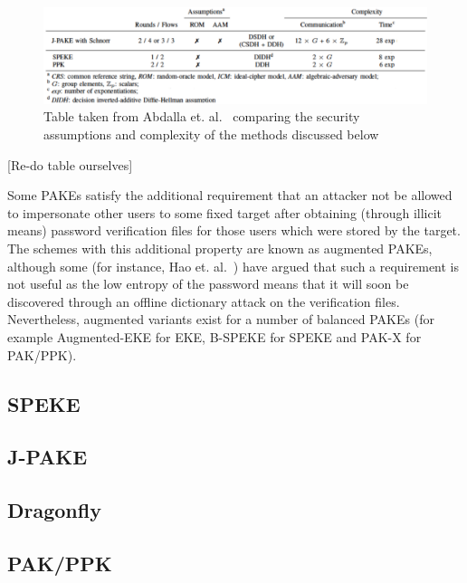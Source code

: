 \documentclass{amsart}
\newcommand{\comment}[1]{\marginpar{\color{red}{\Huge$*$}}\mbox{}{\sf\color{red}[#1]}}
\theoremstyle{remark}
\begin{document}
 \begin{figure}[ht]
 \includegraphics[width=\linewidth]{Comparisons.pdf}
 \caption{Table taken from  Abdalla et. al.~\cite{AbdBenMac15} comparing the security assumptions and complexity of the 
 methods discussed below}
 \label{fig:Compare}
 \end{figure}
 \comment{Re-do table ourselves}

 Some PAKEs satisfy the additional requirement that an attacker not be 
 allowed to impersonate other users to some fixed target after obtaining (through illicit means) password 
 verification files for those users which were stored by the target.  The schemes with this additional property 
 are known as augmented PAKEs, although some (for instance, Hao et. al.~\cite{HaYiChSh15}) have argued that 
 such a requirement is not useful as the low entropy of the password means that it will soon be discovered 
 through an offline dictionary attack on the verification files.  Nevertheless, augmented variants exist for a number
of balanced PAKEs (for example Augmented-EKE for EKE, B-SPEKE for SPEKE and PAK-X for PAK/PPK). 
\vspace{0.3in}

\subsection{SPEKE}
\label{sec:SPEKE}

\vspace{0.3in}

\subsection{J-PAKE} 
\label{sec:JPAKE}

\vspace{0.3in}

\subsection{Dragonfly}
\label{sec:Dragon}

\vspace{0.3in}

\subsection{PAK/PPK}
\label{sec:PPK}

\end{document}
